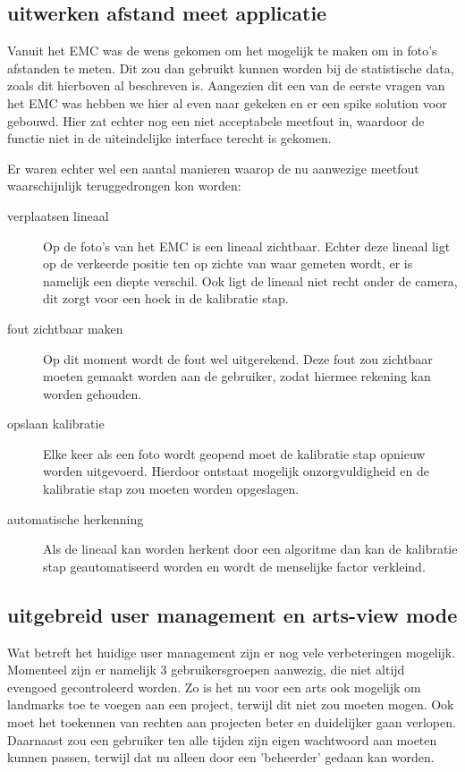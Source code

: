 \subsection{uitwerken afstand meet applicatie} %
Vanuit het EMC was de wens gekomen om het mogelijk te maken om in foto's afstanden te meten.
Dit zou dan gebruikt kunnen worden bij de statistische data, zoals dit hierboven al beschreven is.
Aangezien dit een van de eerste vragen van het EMC was hebben we hier al even naar gekeken en er een spike solution voor gebouwd.
Hier zat echter nog een niet acceptabele meetfout in, waardoor de functie niet in de uiteindelijke interface terecht is gekomen.

Er waren echter wel een aantal manieren waarop de nu aanwezige meetfout waarschijnlijk teruggedrongen kon worden:
\begin{description}
	\item[verplaatsen lineaal] Op de foto's van het EMC is een lineaal zichtbaar. 
	Echter deze lineaal ligt op de verkeerde positie ten op zichte van waar gemeten wordt, er is namelijk een diepte verschil. 
	Ook ligt de lineaal niet recht onder de camera, dit zorgt voor een hoek in de kalibratie stap.
	\item[fout zichtbaar maken] Op dit moment wordt de fout wel uitgerekend. 
	Deze fout zou zichtbaar moeten gemaakt worden aan de gebruiker, zodat hiermee rekening kan worden gehouden.
	\item[opslaan kalibratie] Elke keer als een foto wordt geopend moet de kalibratie stap opnieuw worden uitgevoerd. 
	Hierdoor ontstaat mogelijk onzorgvuldigheid en de kalibratie stap zou moeten worden opgeslagen.
	\item[automatische herkenning] Als de lineaal kan worden herkent door een algoritme dan kan de kalibratie stap geautomatiseerd worden en wordt de menselijke factor verkleind.
\end{description}

\subsection{uitgebreid user management en arts-view mode} %
Wat betreft het huidige user management zijn er nog vele verbeteringen mogelijk.
Momenteel zijn er namelijk 3 gebruikersgroepen aanwezig, die niet altijd evengoed gecontroleerd worden.
Zo is het nu voor een arts ook mogelijk om landmarks toe te voegen aan een project, terwijl dit niet zou moeten mogen.
Ook moet het toekennen van rechten aan projecten beter en duidelijker gaan verlopen.
Daarnaast zou een gebruiker ten alle tijden zijn eigen wachtwoord aan moeten kunnen passen, terwijl dat nu alleen door een 'beheerder' gedaan kan worden.


